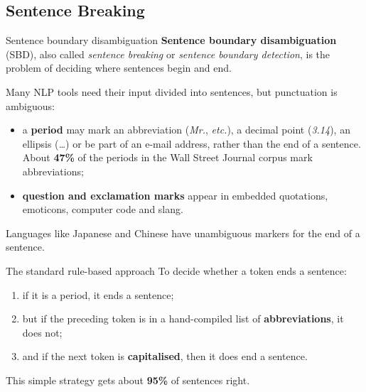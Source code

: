 \subsection{Sentence Breaking}
\label{sec:sentence-breaking}

\begin{nbdef}{Sentence boundary disambiguation}
\textbf{Sentence boundary disambiguation} (SBD), also called \emph{sentence breaking}
or \emph{sentence boundary detection}, is the problem of deciding where sentences begin
and end.
\end{nbdef}

Many NLP tools need their input divided into sentences, but punctuation is ambiguous:
\begin{itemize}[nosep]
  \item a \textbf{period} may mark an abbreviation (\emph{Mr.}, \emph{etc.}), a decimal
        point (\emph{3.14}), an ellipsis (\emph{\ldots}) or be part of an e-mail
        address, rather than the end of a sentence. About \textbf{47\%} of the periods
        in the Wall Street Journal corpus mark abbreviations;
  \item \textbf{question and exclamation marks} appear in embedded quotations, emoticons,
        computer code and slang.
\end{itemize}
Languages like Japanese and Chinese have unambiguous markers for the end of a sentence.

\begin{nbfact}{The standard rule-based approach}
To decide whether a token ends a sentence:
\begin{enumerate}[label=(\alph*), nosep]
  \item if it is a period, it ends a sentence;
  \item but if the preceding token is in a hand-compiled list of
        \textbf{abbreviations}, it does not;
  \item and if the next token is \textbf{capitalised}, then it does end a sentence.
\end{enumerate}
This simple strategy gets about \textbf{95\%} of sentences right.
\end{nbfact}

